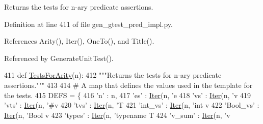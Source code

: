 \begin{DoxyVerb}Returns the tests for n-ary predicate assertions.\end{DoxyVerb}
 

Definition at line 411 of file gen\+\_\+gtest\+\_\+pred\+\_\+impl.\+py.



References Arity(), Iter(), One\+To(), and Title().



Referenced by Generate\+Unit\+Test().


\begin{DoxyCode}
411 \textcolor{keyword}{def }\hyperlink{namespacegen__gtest__pred__impl_ab0da913fa15e5695d5bb2dd1de5dec57}{TestsForArity}(n):
412   \textcolor{stringliteral}{"""Returns the tests for n-ary predicate assertions."""}
413 
414   \textcolor{comment}{# A map that defines the values used in the template for the tests.}
415   DEFS = \{
416     \textcolor{stringliteral}{'n'} : n,
417     \textcolor{stringliteral}{'es'} : \hyperlink{namespacegen__gtest__pred__impl_ac016218b7c9437d1d5ac85c574c83069}{Iter}(n, \textcolor{stringliteral}{'e%
418     \textcolor{stringliteral}{'vs'} : \hyperlink{namespacegen__gtest__pred__impl_ac016218b7c9437d1d5ac85c574c83069}{Iter}(n, \textcolor{stringliteral}{'v%
419     \textcolor{stringliteral}{'vts'} : \hyperlink{namespacegen__gtest__pred__impl_ac016218b7c9437d1d5ac85c574c83069}{Iter}(n, \textcolor{stringliteral}{'#v%
420     \textcolor{stringliteral}{'tvs'} : \hyperlink{namespacegen__gtest__pred__impl_ac016218b7c9437d1d5ac85c574c83069}{Iter}(n, \textcolor{stringliteral}{'T%
421     \textcolor{stringliteral}{'int\_vs'} : \hyperlink{namespacegen__gtest__pred__impl_ac016218b7c9437d1d5ac85c574c83069}{Iter}(n, \textcolor{stringliteral}{'int v%
422     \textcolor{stringliteral}{'Bool\_vs'} : \hyperlink{namespacegen__gtest__pred__impl_ac016218b7c9437d1d5ac85c574c83069}{Iter}(n, \textcolor{stringliteral}{'Bool v%
423     \textcolor{stringliteral}{'types'} : \hyperlink{namespacegen__gtest__pred__impl_ac016218b7c9437d1d5ac85c574c83069}{Iter}(n, \textcolor{stringliteral}{'typename T%
424     \textcolor{stringliteral}{'v\_sum'} : \hyperlink{namespacegen__gtest__pred__impl_ac016218b7c9437d1d5ac85c574c83069}{Iter}(n, \textcolor{stringliteral}{'v%
}}}}}}}}
\end{DoxyCode}
